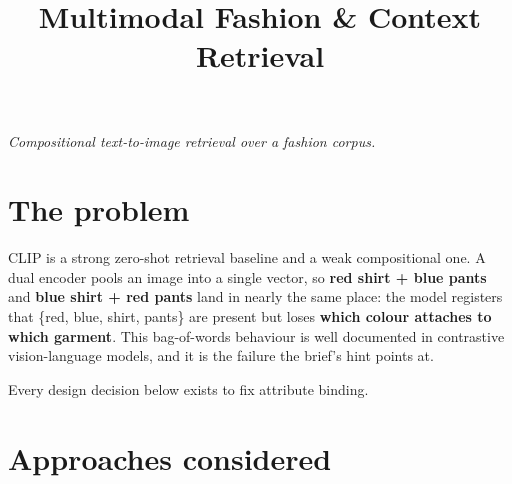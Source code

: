 \documentclass[10pt,a4paper]{article}
\title{\vspace{-12mm}\textbf{Multimodal Fashion \& Context Retrieval}}
\author{}
\date{}
\begin{document}
\maketitle
\vspace{-16mm}
{\small\itshape Compositional text-to-image retrieval over a fashion corpus.}
\vspace{2mm}

\section{The problem}

CLIP is a strong zero-shot retrieval baseline and a weak compositional one. A dual
encoder pools an image into a single vector, so \textbf{red shirt + blue pants} and
\textbf{blue shirt + red pants} land in nearly the same place: the model registers
that \{red, blue, shirt, pants\} are present but loses \textbf{which colour attaches
to which garment}. This bag-of-words behaviour is well documented in contrastive
vision-language models, and it is the failure the brief's hint points at.

Every design decision below exists to fix attribute binding.

\section{Approaches considered}
\end{document}
